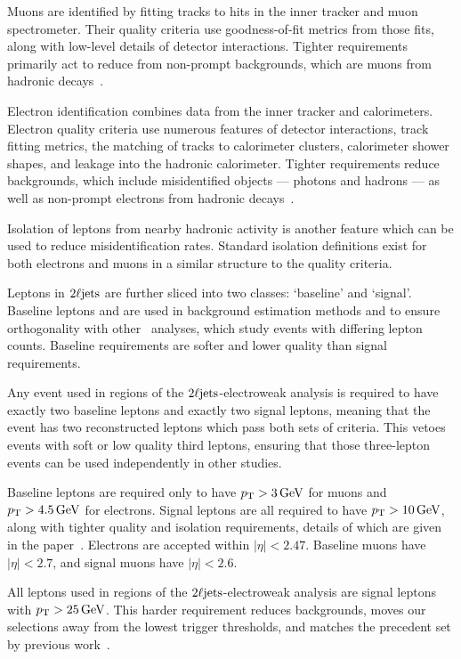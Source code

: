 Muons are identified by fitting tracks to hits in the inner tracker and muon
spectrometer.
Their quality criteria use goodness-of-fit metrics from those fits, along with
low-level details of detector interactions.
Tighter requirements primarily act to reduce from non-prompt backgrounds,
which are muons from hadronic decays~\cite{atlas_muon_quality_MUON_2018_03}.

Electron identification combines data from the inner tracker and
calorimeters.
Electron quality criteria use numerous features of detector
interactions, track fitting metrics, the matching of tracks to calorimeter
clusters, calorimeter shower shapes, and leakage into the hadronic calorimeter.
Tighter requirements reduce backgrounds, which include misidentified objects
--- photons and hadrons --- as well as non-prompt electrons from hadronic
decays~\cite{atlas_egamma_quality_EGAM_2018_01}.

Isolation of leptons from nearby hadronic activity is another feature which
can be used to reduce misidentification rates.
Standard isolation definitions exist for both electrons and muons in a similar
structure to the quality criteria.

Leptons in $\twoljets$ are further sliced into two classes:
`baseline' and `signal'.
Baseline leptons and are used in background estimation methods and to ensure
orthogonality with other \atlas\ analyses, which study events with differing
lepton counts.
Baseline requirements are softer and lower quality than signal requirements.

Any event used in regions of the $\twoljets$-electroweak analysis is required
to have exactly two baseline leptons and exactly two signal leptons, meaning
that the event has two reconstructed leptons which pass both sets of criteria.
This vetoes events with soft or low quality third leptons, ensuring that those
three-lepton events can be used independently in other studies.

Baseline leptons are required only to have $\pt > 3\,\eV[G]$ for muons and
$\pt > 4.5\,\eV[G]$ for electrons.
Signal leptons are all required to have $\pt > 10\,\eV[G]$, along with tighter
quality and isolation requirements, details of which are given in the
paper~\cite{atlas2022searches}.
Electrons are accepted within $|\eta| < 2.47$.
Baseline muons have $|\eta| < 2.7$, and signal muons have $|\eta| < 2.6$.


All leptons used in regions of the $\twoljets$-electroweak analysis are signal
leptons with $\pt > 25\,\eV[G]$.
This harder requirement reduces backgrounds, moves our selections away from the
lowest trigger thresholds, and matches the precedent set by previous
work~\cite{atlas_23l_SUSY_2016_24}.


